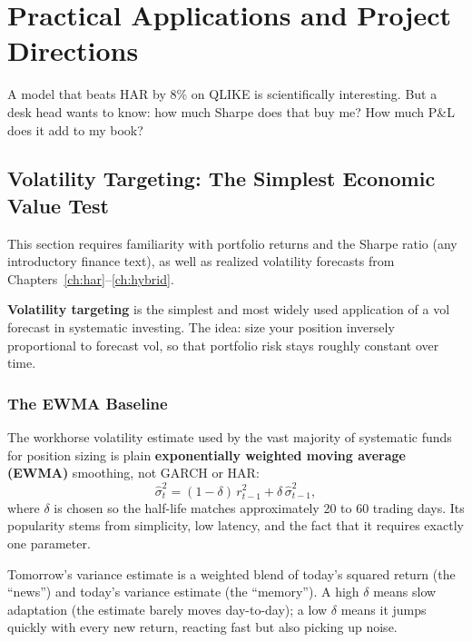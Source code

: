 \chapter{Practical Applications and Project Directions}
\label{ch:applications}

A model that beats HAR by 8\% on QLIKE is scientifically interesting.
But a desk head wants to know: how much Sharpe does that buy me?
How much P\&L does it add to my book?

\section{Volatility Targeting: The Simplest Economic Value Test}
\label{sec:vol-targeting}

\begin{prereq}[Background]
This section requires familiarity with portfolio returns and the Sharpe ratio (any introductory finance text),
as well as realized volatility forecasts from Chapters~\ref{ch:har}--\ref{ch:hybrid}.
\end{prereq}

\textbf{Volatility targeting} is the simplest and most widely used application of a vol forecast in systematic investing.
The idea: size your position inversely proportional to forecast vol, so that portfolio risk stays roughly constant over time.

\subsection{The EWMA Baseline}
\label{subsec:ewma-baseline}

The workhorse volatility estimate used by the vast majority of systematic funds for position sizing is plain \textbf{exponentially weighted moving average (EWMA)} smoothing, not GARCH or HAR:
\begin{equation}
\label{eq:ewma}
\hat\sigma^2_t = (1-\delta)\,r_{t-1}^2 + \delta\,\hat\sigma^2_{t-1},
\end{equation}
where $\delta$ is chosen so the half-life matches approximately 20 to 60 trading days.
Its popularity stems from simplicity, low latency, and the fact that it requires exactly one parameter.

\begin{intuition}
Tomorrow's variance estimate is a weighted blend of today's squared return (the ``news'') and today's variance estimate (the ``memory'').
A high $\delta$ means slow adaptation (the estimate barely moves day-to-day); a low $\delta$ means it jumps quickly with every new return, reacting fast but also picking up noise.
\end{intuition}


